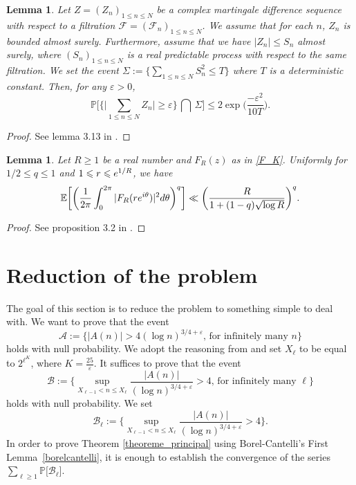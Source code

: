 \documentclass{article}
\newtheorem{lemma}[theorem]{Lemma}
\begin{document}
\begin{lemma}\label{updated_hoeffding}
    Let $Z=(Z_n)_{1 \leqslant   n \leqslant   N}$ be a complex martingale difference sequence with respect to a filtration $\mathcal{F}=(\mathcal{F}_n)_{1 \leqslant  n \leqslant  N }$.
    We assume that for each $n$, $Z_n$ is bounded almost surely.
    Furthermore, assume that we have $|Z_n| \leqslant   S_n$ almost surely, where $(S_n)_{1 \leqslant  n \leqslant  N }$ is a real predictable process with respect to the same filtration. We set the event $\Sigma:= \bigg\{ \sum_{1\leqslant   n \leqslant   N}S_n^2 \leqslant   T\bigg\}$ where $T$ is a  deterministic constant.
    Then, for any $\varepsilon >0$,
    $$ \mathbb{P}\bigg[\bigg\{\bigg|\sum_{1\leqslant   n \leqslant   N}Z_n\bigg|\geqslant \varepsilon\bigg\}\, \bigcap \, \Sigma \bigg] \leqslant   2\exp\bigg(\frac{-\varepsilon^2}{10T}\bigg).$$
\end{lemma}
\begin{proof}[Proof]
See lemma 3.13 in \cite{Rachid}.
\end{proof}

\begin{lemma}\label{multiplicative_chaos}
    Let $R \geqslant 1$ be a real number and $F_R(z)$ as in \eqref{F_K}. Uniformly for $1/2 \leqslant q \leqslant 1$ and $1\leqslant r \leqslant {\rm e}^{1/R}$, we have
    $$
    \mathbb{E}\bigg[\bigg( \frac{1}{2\pi} \int_{0}^{2\pi} |F_R(r{\rm e}^{i\theta})|^2{\rm d}\theta \bigg)^q\bigg]\ll \bigg(\frac{R}{1+(1-q)\sqrt{\log R}}\bigg)^q.
    $$
\end{lemma}
\begin{proof}[Proof]
    See proposition 3.2 in \cite{model_zaman}.
\end{proof}
\section{Reduction of the problem}\label{section_reduction_chapter_2}
The goal of this section is to reduce the problem to something simple to deal with. We want to prove that the event
$$ \mathcal{A}:=\big\{ |A(n)|> 4(\log n )^{3/4 + \varepsilon}     \text{, for infinitely many }n\big\}$$
holds with null probability. We adopt the reasoning from \cite{Rachid} and set $X_{\ell}$ to be equal to $2^{\ell^K}$, where $K=\frac{25}{\varepsilon}$. It suffices to prove that the event 
$$ \mathcal{B}:=\bigg\{ \sup_{X_{\ell  -1}<n\leqslant X_{\ell}}\frac{|A(n)|}{(\log n )^{3/4 + \varepsilon}}> 4    \text{, for infinitely many }\ell\bigg\}$$ 
holds with null probability. We set
$$
\mathcal{B}_{\ell} := \bigg\{ \sup_{X_{\ell  -1}<n\leqslant X_{\ell}}\frac{|A(n)|}{(\log n )^{3/4 + \varepsilon}}> 4  \bigg\}.
$$
In order to prove Theorem \ref{theoreme_principal} using Borel-Cantelli's First Lemma~\ref{borelcantelli}, it is enough to establish the convergence of the series $ \sum_{\ell \geqslant 1} \mathbb{P}\big[\mathcal{B}_{\ell}\big]$.
\end{document}
